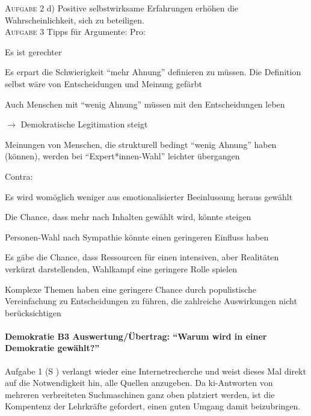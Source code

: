 \textsc{Aufgabe 2} d) \quad
Positive selbstwirksame Erfahrungen erhöhen die Wahrscheinlichkeit, sich zu beteiligen. 
\\

\textsc{Aufgabe 3} \quad
Tipps für Argumente:
Pro:
\begin{myitemize}
    \item Es ist gerechter
    \item Es erpart die Schwierigkeit \enquote{mehr Ahnung} definieren zu müssen. Die Definition selbst wäre von Entscheidungen und Meinung gefärbt
    \item Auch Menschen mit \enquote{wenig Ahnung} müssen mit den Entscheidungen leben 
    \item $\rightarrow$ Demokratische Legitimation steigt 
    \item Meinungen von Menschen, die strukturell bedingt \enquote{wenig Ahnung} haben (können), werden bei \enquote{Expert*innen-Wahl} leichter übergangen
\end{myitemize}
Contra:
\begin{myitemize}
    \item Es wird womöglich weniger aus emotionalisierter Beeinlussung heraus gewählt
    \item Die Chance, dass mehr nach Inhalten gewählt wird, könnte steigen
    \item Personen-Wahl nach Sympathie könnte einen geringeren Einfluss haben 
    \item Es gäbe die Chance, dass Ressourcen für einen intensiven, aber Realitäten verkürzt darstellenden, Wahlkampf eine geringere Rolle spielen
    \item Komplexe Themen haben eine geringere Chance durch populistische Vereinfachung zu Entscheidungen zu führen, die zahlreiche Auswirkungen nicht berücksichtigen 
\end{myitemize}

\paragraph{Demokratie B3 Auswertung/Übertrag: \enquote{Warum wird in einer Demokratie gewählt?}} 
Aufgabe 1 (\gls{S} \pageref{DEMOKRATIE-B3}) verlangt wieder eine Internetrecherche und weist dieses Mal direkt auf die Notwendigkeit hin, alle Quellen anzugeben. Da \gls{ki}-Antworten von mehreren verbreiteten Suchmaschinen ganz oben platziert werden, ist die Kompentenz der Lehrkräfte gefordert, einen guten Umgang damit beizubringen. 

